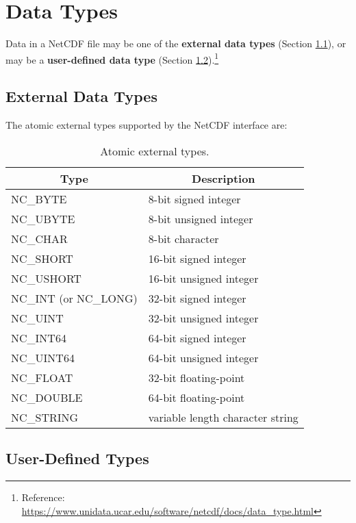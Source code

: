 \section{Data Types}


Data in a NetCDF file may be one of the \textbf{external data types} (Section \ref{ed-type}), or may be a \textbf{user-defined data type} (Section \ref{ud-type}).\footnote{Reference: \url{https://www.unidata.ucar.edu/software/netcdf/docs/data_type.html}}

\subsection{External Data Types}
\label{ed-type}


The atomic external types supported by the NetCDF interface are:

\begin{table}[H]
\centering
\begin{tabular}{|l|l|}
\hline
\multicolumn{1}{|c|}{Type} & \multicolumn{1}{|c|}{Description} \\ \hline \hline
NC\_BYTE & 8-bit signed integer \\ \hline
NC\_UBYTE & 8-bit unsigned integer \\ \hline
NC\_CHAR & 8-bit character \\ \hline
NC\_SHORT & 16-bit signed integer \\ \hline
NC\_USHORT & 16-bit unsigned integer \\ \hline
NC\_INT (or NC\_LONG) & 32-bit signed integer \\ \hline
NC\_UINT & 32-bit unsigned integer \\ \hline
NC\_INT64 & 64-bit signed integer \\ \hline
NC\_UINT64 & 64-bit unsigned integer \\ \hline
NC\_FLOAT & 32-bit floating-point \\ \hline
NC\_DOUBLE & 64-bit floating-point \\ \hline
NC\_STRING & variable length character string \\ \hline
\hline
\end{tabular}
\caption{\label{tab_modes_open} Atomic external types.}
\end{table}

\subsection{User-Defined Types}
\label{ud-type}


